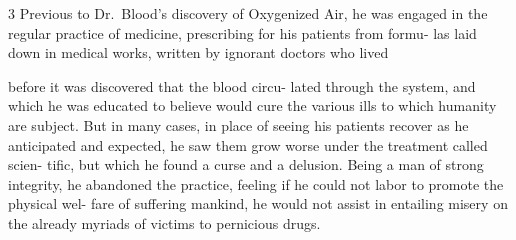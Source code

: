 \documentclass[10pt]{article}
\begin{document}
\begin{multicols}{3}
	Previous to Dr.~Blood's discovery of Oxygenized Air, he was engaged\linebreak
	in the regular practice of medicine, prescribing for his patients
	from formu-\linebreak
	las laid down in medical works, written by ignorant doctors who
	lived%
	\begin{figure}
		\vfill
	\end{figure}
	before it was discovered that the blood circu-\linebreak
	lated through the system, and which he was\linebreak
	educated to believe would cure the various ills\linebreak
	to which humanity are subject. But in many\linebreak
	cases, in place of seeing his patients recover\linebreak
	as he anticipated and expected, he saw them\linebreak
	grow worse under the treatment called scien-\linebreak
	tific, but which he found a curse and a\linebreak
	delusion. Being a man of strong integrity,\linebreak
	he abandoned the practice, feeling if he\linebreak
	could not labor to promote the physical wel-\linebreak
	fare of suffering mankind, he would not assist\linebreak
	in entailing misery on the already myriads of\linebreak
	victims to pernicious drugs.


\end{multicols}
\end{document}

